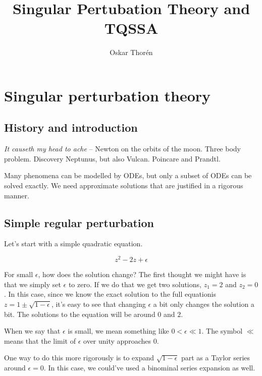 \documentclass[12pt]{report}
\begin{document}


\title{Singular Pertubation Theory and TQSSA}
\author{Oskar Thor\'{e}n}

\maketitle

\chapter{Singular perturbation theory}

\section{History and introduction}

\textit{It causeth my head to ache} -- Newton on the orbits of the moon. Three
body problem. Discovery Neptunus, but also Vulcan. Poincare and Prandtl.

Many phenomena can be modelled by ODEs, but only a subset of ODEs can be solved
exactly. We need approximate solutions that are justified in a rigorous manner.

\section{Simple regular perturbation}

Let's start with a simple quadratic equation.

\begin{equation}
  z^2 - 2z + \epsilon
\end{equation}


For small $\epsilon$, how does the solution change? The first thought we might
have is that we simply set $\epsilon$ to zero. If we do that we get two
solutions, $z_1 = 2$ and $z_2 = 0$. In this case, since we know the exact
solution to the full equationis $z = 1 \pm \sqrt{1-\epsilon}$, it's easy to see
that changing $\epsilon$ a bit only changes the solution a bit. The solutions to
the equation will be around $0$ and $2$.

When we say that $\epsilon$ is small, we mean something like $0 < \epsilon
\ll 1$. The symbol $\ll$ means that the limit of $\epsilon$ over unity
approaches $0$.

One way to do this more rigorously is to expand $\sqrt{1-\epsilon}$ part as a
Taylor series around $\epsilon = 0$. In this case, we could've used a binominal series expansion as
well.
\end{document}
